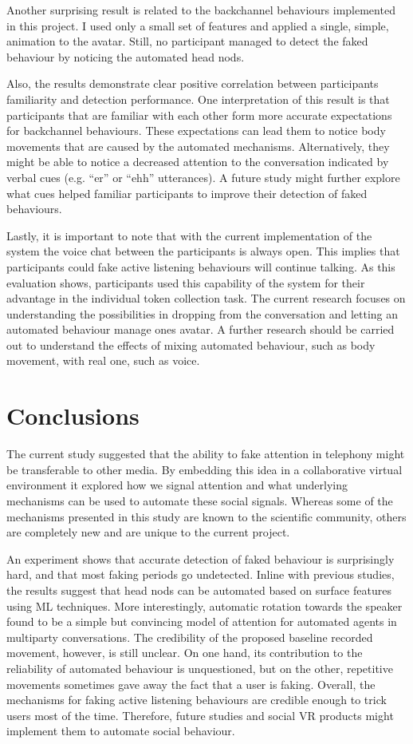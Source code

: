 \documentclass[]{simple-thesis}
\begin{document}
Another surprising result is related to the backchannel behaviours implemented in this project.
I used only a small set of features and applied a single, simple, animation to the avatar.
Still, no participant managed to detect the faked behaviour by noticing the automated head nods.

Also, the results demonstrate clear positive correlation between participants familiarity and detection performance.
One interpretation of this result is that participants that are familiar with each other form more accurate expectations for backchannel behaviours.
These expectations can lead them to notice body movements that are caused by the automated mechanisms.
Alternatively, they might be able to notice a decreased attention to the conversation indicated by verbal cues (e.g. ``er'' or ``ehh'' utterances).
A future study might further explore what cues helped familiar participants to improve their detection of faked behaviours.

Lastly, it is important to note that with the current implementation of the system the voice chat between the participants is always open.
This implies that participants could fake active listening behaviours will continue talking.
As this evaluation shows, participants used this capability of the system for their advantage in the individual token collection task.
The current research focuses on understanding the possibilities in dropping from the conversation and letting an automated behaviour manage ones avatar.
A further research should be carried out to understand the effects of mixing automated behaviour, such as body movement, with real one, such as voice.


\chapter{Conclusions}\label{conclusions}

The current study suggested that the ability to fake attention in telephony might be transferable to other media.
By embedding this idea in a collaborative virtual environment it explored how we signal attention and what underlying mechanisms can be used to automate these social signals.
Whereas some of the mechanisms presented in this study are known to the scientific community, others are completely new and are unique to the current project.

An experiment shows that accurate detection of faked behaviour is surprisingly hard, and that most faking periods go undetected.
Inline with previous studies, the results suggest that head nods can be automated based on surface features using ML techniques.
More interestingly, automatic rotation towards the speaker found to be a simple but convincing model of attention for automated agents in multiparty conversations.
The credibility of the proposed baseline recorded movement, however, is still unclear.
On one hand, its contribution to the reliability of automated behaviour is unquestioned, but on the other, repetitive movements sometimes gave away the fact that a user is faking.
Overall, the mechanisms for faking active listening behaviours are credible enough to trick users most of the time.
Therefore, future studies and social VR products might implement them to automate social behaviour.
\end{document}
